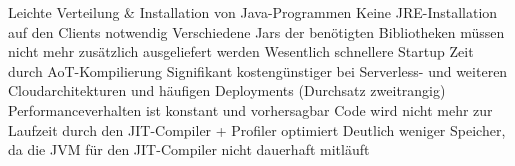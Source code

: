 Leichte Verteilung \& Installation von Java-Programmen
Keine JRE-Installation auf den Clients notwendig
Verschiedene Jars der benötigten Bibliotheken müssen nicht mehr zusätzlich ausgeliefert werden
Wesentlich schnellere Startup Zeit durch AoT-Kompilierung
Signifikant kostengünstiger bei Serverless- und weiteren Cloudarchitekturen und häufigen Deployments (Durchsatz zweitrangig)
Performanceverhalten ist konstant und vorhersagbar
Code wird nicht mehr zur Laufzeit durch den JIT-Compiler + Profiler optimiert
Deutlich weniger Speicher, da die JVM für den JIT-Compiler nicht dauerhaft mitläuft


